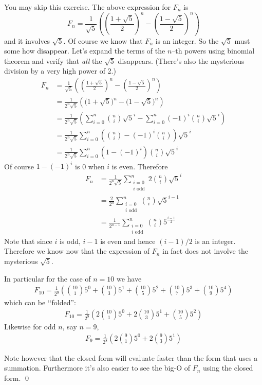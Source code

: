 \begin{ex} [REMOVE?]
You may skip this exercise.
The above expression for $F_n$ is
\[
F_n = 
\frac{1}{\sqrt{5}} 
\left( 
\left( \frac{1 + \sqrt{5}}{2} \right)^n
-
\left( \frac{1 - \sqrt{5}}{2} \right)^n
\right)
\]
and it involves $\sqrt{5}$. 
Of course we know that $F_n$ is an integer.
So the $\sqrt{5}$ must some how disappear.
Let's expand the terms of the $n$--th powers
using binomial theorem and
verify that \textit{all} the $\sqrt{5}$ disappears.
(There's also the mysterious division
by a very high power of 2.)
\begin{align*}
F_n 
&= 
\frac{1}{\sqrt{5}} 
\left( 
\left( \frac{1 + \sqrt{5}}{2} \right)^n
-
\left( \frac{1 - \sqrt{5}}{2} \right)^n
\right) \\
&=
\frac{1}{2^n\sqrt{5}} 
\left( 
\bigl(
1 + \sqrt{5}
\bigr)^n
-
\bigl(
1 - \sqrt{5}
\bigr)^n
\right) \\
&=
\frac{1}{2^n\sqrt{5}} 
\left(
\sum_{i=0}^n \binom{n}{i}\sqrt{5}^i
- 
\sum_{i=0}^n (-1)^i\binom{n}{i}\sqrt{5}^i
\right) \\
&=
\frac{1}{2^n\sqrt{5}} 
\sum_{i=0}^n 
\left(
\binom{n}{i}
- 
(-1)^i\binom{n}{i}
\right)
\sqrt{5}^i \\
&=
\frac{1}{2^n\sqrt{5}} 
\sum_{i=0}^n 
(1
- 
(-1)^i)
\binom{n}{i}
\sqrt{5}^i
\end{align*}
Of course $1 - (-1)^i$ is 0 when $i$ is even.
Therefore
\begin{align*}
F_n 
&=
\frac{1}{2^n\sqrt{5}} 
\sum_{\substack{i=0 \\ i \text{ odd}}}^n 
2
\binom{n}{i}
\sqrt{5}^i \\
&=
\frac{2}{2^n} 
\sum_{\substack{i=0 \\ i \text{ odd}}}^n 
\binom{n}{i}
\sqrt{5}^{i-1} \\
&=
\frac{1}{2^{n-1}} 
\sum_{\substack{i=0 \\ i \text{ odd}}}^n 
\binom{n}{i}
5^{\frac{i-1}{2}}
\end{align*}
Note that since $i$ is odd, $i-1$ is even and 
hence $(i-1)/2$ is an integer.
Therefore we know now
that the expression of $F_n$ in fact does not involve the
mysterious $\sqrt{5}$.

In particular for the case of $n = 10$ we have
\begin{align*}
F_{10}
= \frac{1}{2^{9}} 
\left(
\binom{10}{1} 5^{0} +
\binom{10}{3} 5^{1} +
\binom{10}{5} 5^{2} +
\binom{10}{7} 5^{3} +
\binom{10}{9} 5^{4}
\right)
\end{align*}
which can be \lq\lq folded'':
\begin{align*}
F_{10}
= \frac{1}{2^{9}} 
\left(
2\binom{10}{1} 5^{0} +
2\binom{10}{3} 5^{1} +
\binom{10}{5} 5^{2}
\right)
\end{align*}
Likewise for odd $n$, say $n = 9$, 
\begin{align*}
F_{9}
= \frac{1}{2^{8}} 
\left(
2\binom{9}{1} 5^{0} +
2\binom{9}{3} 5^{1}
\right)
\end{align*}

Note however that the closed form will evaluate faster
than the form that uses a summation.
Furthermore it's also easier to see the big-O of $F_n$
using the closed form.
\qed
\end{ex}

